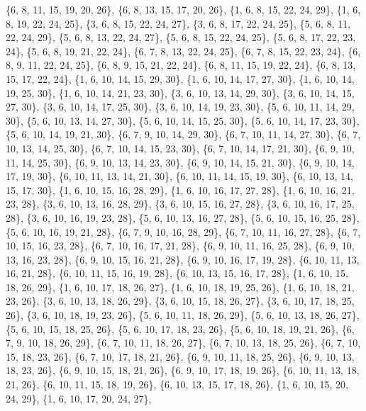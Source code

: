 \documentclass[11pt,a4paper]{article}
\begin{document}
{\{6, 8, 11, 15, 19, 20, 26\}, \{6, 8, 13, 15, 17, 20, 26\}, \{1, 6, 8, 15, 22, 24, 29\}, \{1, 6, 8, 19, 22, 24, 25\}, \{3, 6, 8, 15, 22, 24, 27\},
\{3, 6, 8, 17, 22, 24, 25\}, \{5, 6, 8, 11, 22, 24, 29\}, \{5, 6, 8, 13, 22, 24, 27\}, \{5, 6, 8, 15, 22, 24, 25\}, \{5, 6, 8, 17, 22, 23, 24\},
\{5, 6, 8, 19, 21, 22, 24\}, \{6, 7, 8, 13, 22, 24, 25\}, \{6, 7, 8, 15, 22, 23, 24\}, \{6, 8, 9, 11, 22, 24, 25\}, \{6, 8, 9, 15, 21, 22, 24\},
\{6, 8, 11, 15, 19, 22, 24\}, \{6, 8, 13, 15, 17, 22, 24\}, \{1, 6, 10, 14, 15, 29, 30\}, \{1, 6, 10, 14, 17, 27, 30\}, \{1, 6, 10, 14, 19, 25, 30\},
\{1, 6, 10, 14, 21, 23, 30\}, \{3, 6, 10, 13, 14, 29, 30\}, \{3, 6, 10, 14, 15, 27, 30\}, \{3, 6, 10, 14, 17, 25, 30\}, \{3, 6, 10, 14, 19, 23, 30\},
\{5, 6, 10, 11, 14, 29, 30\}, \{5, 6, 10, 13, 14, 27, 30\}, \{5, 6, 10, 14, 15, 25, 30\}, \{5, 6, 10, 14, 17, 23, 30\}, \{5, 6, 10, 14, 19, 21, 30\},
\{6, 7, 9, 10, 14, 29, 30\}, \{6, 7, 10, 11, 14, 27, 30\}, \{6, 7, 10, 13, 14, 25, 30\}, \{6, 7, 10, 14, 15, 23, 30\}, \{6, 7, 10, 14, 17, 21, 30\},
\{6, 9, 10, 11, 14, 25, 30\}, \{6, 9, 10, 13, 14, 23, 30\}, \{6, 9, 10, 14, 15, 21, 30\}, \{6, 9, 10, 14, 17, 19, 30\}, \{6, 10, 11, 13, 14, 21, 30\},
\{6, 10, 11, 14, 15, 19, 30\}, \{6, 10, 13, 14, 15, 17, 30\}, \{1, 6, 10, 15, 16, 28, 29\}, \{1, 6, 10, 16, 17, 27, 28\}, \{1, 6, 10, 16, 21, 23, 28\},
\{3, 6, 10, 13, 16, 28, 29\}, \{3, 6, 10, 15, 16, 27, 28\}, \{3, 6, 10, 16, 17, 25, 28\}, \{3, 6, 10, 16, 19, 23, 28\}, \{5, 6, 10, 13, 16, 27, 28\},
\{5, 6, 10, 15, 16, 25, 28\}, \{5, 6, 10, 16, 19, 21, 28\}, \{6, 7, 9, 10, 16, 28, 29\}, \{6, 7, 10, 11, 16, 27, 28\}, \{6, 7, 10, 15, 16, 23, 28\},
\{6, 7, 10, 16, 17, 21, 28\}, \{6, 9, 10, 11, 16, 25, 28\}, \{6, 9, 10, 13, 16, 23, 28\}, \{6, 9, 10, 15, 16, 21, 28\}, \{6, 9, 10, 16, 17, 19, 28\},
\{6, 10, 11, 13, 16, 21, 28\}, \{6, 10, 11, 15, 16, 19, 28\}, \{6, 10, 13, 15, 16, 17, 28\}, \{1, 6, 10, 15, 18, 26, 29\}, \{1, 6, 10, 17, 18, 26, 27\},
\{1, 6, 10, 18, 19, 25, 26\}, \{1, 6, 10, 18, 21, 23, 26\}, \{3, 6, 10, 13, 18, 26, 29\}, \{3, 6, 10, 15, 18, 26, 27\}, \{3, 6, 10, 17, 18, 25, 26\},
\{3, 6, 10, 18, 19, 23, 26\}, \{5, 6, 10, 11, 18, 26, 29\}, \{5, 6, 10, 13, 18, 26, 27\}, \{5, 6, 10, 15, 18, 25, 26\}, \{5, 6, 10, 17, 18, 23, 26\},
\{5, 6, 10, 18, 19, 21, 26\}, \{6, 7, 9, 10, 18, 26, 29\}, \{6, 7, 10, 11, 18, 26, 27\}, \{6, 7, 10, 13, 18, 25, 26\}, \{6, 7, 10, 15, 18, 23, 26\},
\{6, 7, 10, 17, 18, 21, 26\}, \{6, 9, 10, 11, 18, 25, 26\}, \{6, 9, 10, 13, 18, 23, 26\}, \{6, 9, 10, 15, 18, 21, 26\}, \{6, 9, 10, 17, 18, 19, 26\},
\{6, 10, 11, 13, 18, 21, 26\}, \{6, 10, 11, 15, 18, 19, 26\}, \{6, 10, 13, 15, 17, 18, 26\}, \{1, 6, 10, 15, 20, 24, 29\}, \{1, 6, 10, 17, 20, 24, 27\},
}
\end{document}
